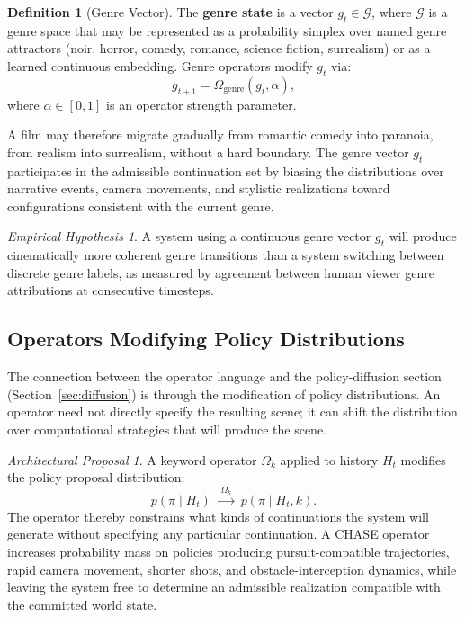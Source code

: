 \documentclass[12pt,a4paper]{article}
\theoremstyle{plain}
\theoremstyle{definition}
\newtheorem{definition}[theorem]{Definition}
\theoremstyle{remark}
\newtheorem{hypothesis}[theorem]{Empirical Hypothesis}
\newtheorem{proposal}[theorem]{Architectural Proposal}
\begin{document}
\begin{definition}[Genre Vector]
The \textbf{genre state} is a vector $g_t \in \mathcal{G}$, where $\mathcal{G}$ is a genre space that may be represented as a probability simplex over named genre attractors (noir, horror, comedy, romance, science fiction, surrealism) or as a learned continuous embedding. Genre operators modify $g_t$ via:
\[
g_{t+1} = \Omega_{\mathrm{genre}}(g_t, \alpha),
\]
where $\alpha \in [0,1]$ is an operator strength parameter.
\end{definition}

A film may therefore migrate gradually from romantic comedy into paranoia, from realism into surrealism, without a hard boundary. The genre vector $g_t$ participates in the admissible continuation set by biasing the distributions over narrative events, camera movements, and stylistic realizations toward configurations consistent with the current genre.

\begin{hypothesis}
\label{hyp:genre-continuous}
A system using a continuous genre vector $g_t$ will produce cinematically more coherent genre transitions than a system switching between discrete genre labels, as measured by agreement between human viewer genre attributions at consecutive timesteps.
\end{hypothesis}

\subsection{Operators Modifying Policy Distributions}

The connection between the operator language and the policy-diffusion section (Section~\ref{sec:diffusion}) is through the modification of policy distributions. An operator need not directly specify the resulting scene; it can shift the distribution over computational strategies that will produce the scene.

\begin{proposal}
A keyword operator $\Omega_k$ applied to history $H_t$ modifies the policy proposal distribution:
\[
p(\pi \mid H_t) \;\xrightarrow{\;\Omega_k\;}\; p(\pi \mid H_t, k).
\]
The operator thereby constrains what kinds of continuations the system will generate without specifying any particular continuation. A \textsc{CHASE} operator increases probability mass on policies producing pursuit-compatible trajectories, rapid camera movement, shorter shots, and obstacle-interception dynamics, while leaving the system free to determine an admissible realization compatible with the committed world state.
\end{proposal}
\end{document}
